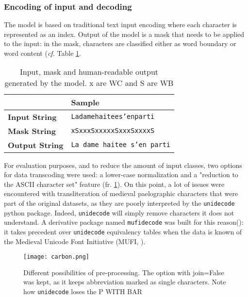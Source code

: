 \documentclass{jdmdh}
\begin{document}
\subsubsection{Encoding of input and decoding}

The model is based on traditional text input encoding where each character is represented as an index. Output of the model is a mask that needs to be applied to the input: in the mask, characters are classified either as word boundary or word content (\textit{cf.} Table \ref{lst:input_output_example}.

\begin{table}[!ht]
\centering
\begin{tabular}{@{}ll@{}}
\hline
                       & \textbf{Sample}           \\  \hline
\textbf{Input  String} & \texttt{Ladamehaitees'enparti}     \\
\textbf{Mask   String} & \texttt{xSxxxSxxxxxSxxxSxxxxS}     \\
\textbf{Output String} & \texttt{La dame haitee s'en parti} \\ \hline
\end{tabular}
  \caption{Input, mask and human-readable output generated by the model. x are WC and S are WB}
  \label{lst:input_output_example}
\end{table}

For evaluation purposes, and to reduce the amount of input classes, two options for data transcoding were used: a lower-case normalization and a "reduction to the ASCII character set" feature (fr. \ref{fig:normalization}). On this point, a lot of issues were encountered with transliteration of medieval paelographic characters that were part of the original datasets, as they are poorly interpreted by the \texttt{unidecode} python package. Indeed, \texttt{unidecode} will simply remove characters it does not understand. A derivative package named \texttt{mufidecode} was built for this reason(\citet{thibault_clerice_2019_3237731}): it takes precedent over \texttt{unidecode} equivalency tables when the data is known of the Medieval Unicode Font Initiative (MUFI, \citet{mufi}).

\begin{figure}[!ht]
  \centering
  \texttt{[image: carbon.png]}
  \caption{Different possibilities of pre-processing. The option with join=False was kept, as it keeps abbreviation marked as single characters. Note how \texttt{unidecode} loses the P WITH BAR}
  \label{fig:normalization}
\end{figure}
\end{document}
